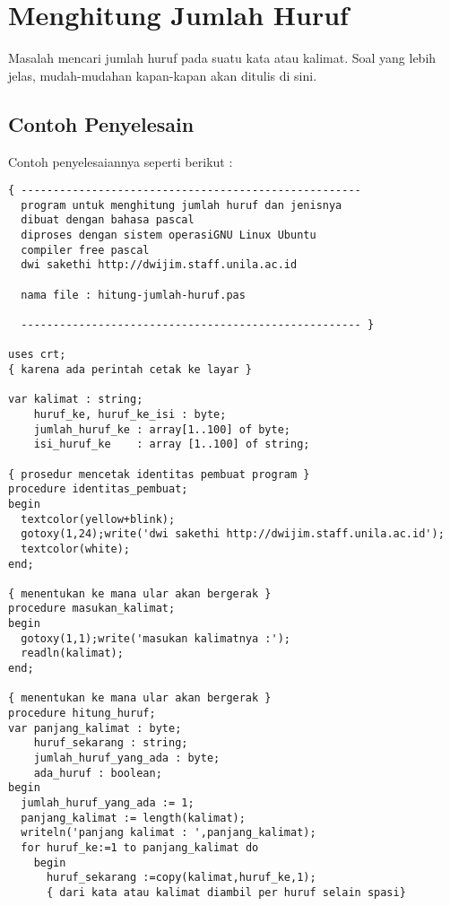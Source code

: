 \documentclass[a4paper,10pt,makeidx]{article}
\begin{document}
\section{Menghitung Jumlah Huruf}
\par
\indent
\indent
Masalah mencari jumlah huruf pada suatu kata atau kalimat. Soal 
yang lebih jelas, mudah-mudahan kapan-kapan akan ditulis di sini.

\subsection{Contoh Penyelesain}
\par
\indent
\indent
Contoh penyelesaiannya seperti berikut :
\begin{verbatim}
{ -----------------------------------------------------
  program untuk menghitung jumlah huruf dan jenisnya
  dibuat dengan bahasa pascal
  diproses dengan sistem operasiGNU Linux Ubuntu
  compiler free pascal 
  dwi sakethi http://dwijim.staff.unila.ac.id

  nama file : hitung-jumlah-huruf.pas

  ----------------------------------------------------- }

uses crt;
{ karena ada perintah cetak ke layar }

var kalimat : string;
    huruf_ke, huruf_ke_isi : byte;
    jumlah_huruf_ke : array[1..100] of byte;
    isi_huruf_ke    : array [1..100] of string;

{ prosedur mencetak identitas pembuat program }
procedure identitas_pembuat;
begin
  textcolor(yellow+blink);
  gotoxy(1,24);write('dwi sakethi http://dwijim.staff.unila.ac.id');
  textcolor(white);
end;

{ menentukan ke mana ular akan bergerak }
procedure masukan_kalimat;
begin
  gotoxy(1,1);write('masukan kalimatnya :');
  readln(kalimat);
end;

{ menentukan ke mana ular akan bergerak }
procedure hitung_huruf;
var panjang_kalimat : byte;
    huruf_sekarang : string;
    jumlah_huruf_yang_ada : byte;
    ada_huruf : boolean;
begin
  jumlah_huruf_yang_ada := 1;
  panjang_kalimat := length(kalimat);
  writeln('panjang kalimat : ',panjang_kalimat);
  for huruf_ke:=1 to panjang_kalimat do
    begin
      huruf_sekarang :=copy(kalimat,huruf_ke,1); 
      { dari kata atau kalimat diambil per huruf selain spasi}


\end{verbatim}
\end{document}
